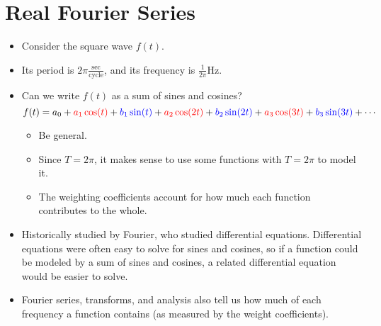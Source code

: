 \documentclass{article}
\begin{document}
\section*{Real Fourier Series}
\begin{itemize}
    \item {}Consider the square wave $f(t)$.
    \begin{center}
    \end{center}
    \item Its period is $2\pi\frac{\text{sec}}{\text{cycle}}$, and its frequency is $\frac{1}{2\pi} \text{Hz}$.
    \item Can we write $f(t)$ as a sum of sines and cosines?
    \begin{equation*}
        f(t) = a_0+{\color{red}a_1\cos(t)}+{\color{blue}b_1\sin(t)}+{\color{red}a_2\cos(2t)}+{\color{blue}b_2\sin(2t)}+{\color{red}a_3\cos(3t)}+{\color{blue}b_3\sin(3t)}+\cdots
    \end{equation*}
    \begin{itemize}
        \item Be general.
        \item Since $T=2\pi$, it makes sense to use some functions with $T=2\pi$ to model it.
        \item The weighting coefficients account for how much each function contributes to the whole.
    \end{itemize}
    \item Historically studied by Fourier, who studied differential equations. Differential equations were often easy to solve for sines and cosines, so if a function could be modeled by a sum of sines and cosines, a related differential equation would be easier to solve.
    \item Fourier series, transforms, and analysis also tell us how much of each frequency a function contains (as measured by the weight coefficients).
\end{itemize}
\end{document}
